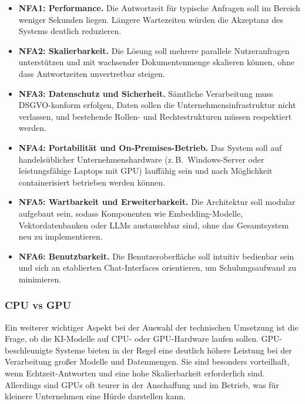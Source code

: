 \begin{itemize}
    \item \textbf{NFA1: Performance.}
    Die Antwortzeit für typische Anfragen soll im Bereich weniger Sekunden liegen.
    Längere Wartezeiten würden die Akzeptanz des Systems deutlich reduzieren.

    \item \textbf{NFA2: Skalierbarkeit.}
    Die Lösung soll mehrere parallele Nutzeranfragen unterstützen und mit wachsender Dokumentenmenge skalieren können, ohne dass Antwortzeiten unvertretbar steigen.

    \item \textbf{NFA3: Datenschutz und Sicherheit.}
    Sämtliche Verarbeitung muss DSGVO-konform erfolgen, Daten sollen die Unternehmensinfrastruktur nicht verlassen, und bestehende Rollen- und Rechtestrukturen müssen respektiert werden.

    \item \textbf{NFA4: Portabilität und On-Premises-Betrieb.}
    Das System soll auf handelsüblicher Unternehmenshardware (z.\,B.\ Windows-Server oder leistungsfähige Laptops mit GPU) lauffähig sein und nach Möglichkeit containerisiert betrieben werden können.

    \item \textbf{NFA5: Wartbarkeit und Erweiterbarkeit.}
    Die Architektur soll modular aufgebaut sein, sodass Komponenten wie Embedding-Modelle, Vektordatenbanken oder LLMs austauschbar sind, ohne das Gesamtsystem neu zu implementieren.

    \item \textbf{NFA6: Benutzbarkeit.}
    Die Benutzeroberfläche soll intuitiv bedienbar sein und sich an etablierten Chat-Interfaces orientieren, um Schulungsaufwand zu minimieren.
\end{itemize}


\subsubsection{CPU vs GPU}\label{subsubsec:cpu-vs-gpu}

Ein weiterer wichtiger Aspekt bei der Auswahl der technischen Umsetzung ist die Frage, ob die KI-Modelle auf CPU- oder GPU-Hardware laufen sollen.
GPU-beschleunigte Systeme bieten in der Regel eine deutlich höhere Leistung bei der Verarbeitung großer Modelle und Datenmengen.
Sie sind besonders vorteilhaft, wenn Echtzeit-Antworten und eine hohe Skalierbarkeit erforderlich sind.
Allerdings sind GPUs oft teurer in der Anschaffung und im Betrieb, was für kleinere Unternehmen eine Hürde darstellen kann.

